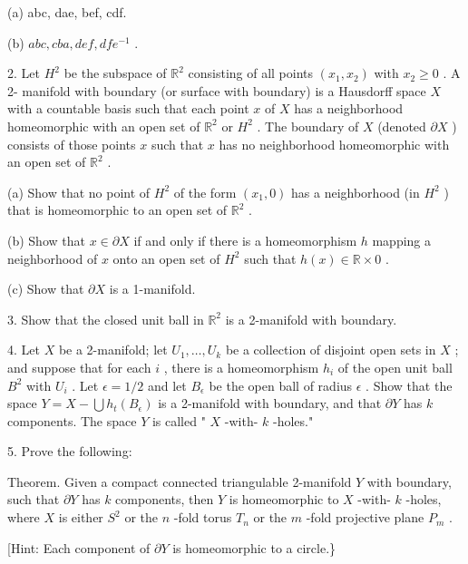 \documentclass[10pt]{article}
\begin{document}
(a) abc, dae, bef, cdf.

(b) \({abc},{cba},{def},{df}{e}^{-1}\) .

2. Let \({H}^{2}\) be the subspace of \({\mathbb{R}}^{2}\) consisting of all points \(\left( {{x}_{1},{x}_{2}}\right)\) with \({x}_{2} \geq  0\) . A 2- manifold with boundary (or surface with boundary) is a Hausdorff space \(X\) with a countable basis such that each point \(x\) of \(X\) has a neighborhood homeomorphic with an open set of \({\mathbb{R}}^{2}\) or \({H}^{2}\) . The boundary of \(X\) (denoted \(\partial X\) ) consists of those points \(x\) such that \(x\) has no neighborhood homeomorphic with an open set of \({\mathbb{R}}^{2}\) .

(a) Show that no point of \({H}^{2}\) of the form \(\left( {{x}_{1},0}\right)\) has a neighborhood (in \({H}^{2}\) ) that is homeomorphic to an open set of \({\mathbb{R}}^{2}\) .

(b) Show that \(x \in  \partial X\) if and only if there is a homeomorphism \(h\) mapping a neighborhood of \(x\) onto an open set of \({H}^{2}\) such that \(h\left( x\right)  \in  \mathbb{R} \times  0\) .

(c) Show that \(\partial X\) is a 1-manifold.

3. Show that the closed unit ball in \({\mathbb{R}}^{2}\) is a 2-manifold with boundary.

4. Let \(X\) be a 2-manifold; let \({U}_{1},\ldots ,{U}_{k}\) be a collection of disjoint open sets in \(X\) ; and suppose that for each \(i\) , there is a homeomorphism \({h}_{i}\) of the open unit ball \({B}^{2}\) with \({U}_{i}\) . Let \(\epsilon  = 1/2\) and let \({B}_{\epsilon }\) be the open ball of radius \(\epsilon\) . Show that the space \(Y = X - \bigcup {h}_{t}\left( {B}_{\epsilon }\right)\) is a 2-manifold with boundary, and that \(\partial Y\) has \(k\) components. The space \(Y\) is called " \(X\) -with- \(k\) -holes."

5. Prove the following:

Theorem. Given a compact connected triangulable 2-manifold \(Y\) with boundary, such that \(\partial Y\) has \(k\) components, then \(Y\) is homeomorphic to \(X\) -with- \(k\) -holes, where \(X\) is either \({S}^{2}\) or the \(n\) -fold torus \({T}_{n}\) or the \(m\) -fold projective plane \({P}_{m}\) .

[Hint: Each component of \(\partial Y\) is homeomorphic to a circle.\}
\end{document}
